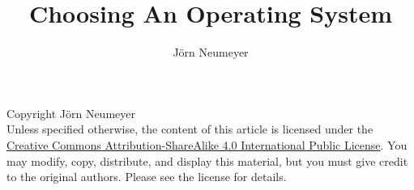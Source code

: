 \documentclass{article}
\author{J\"orn Neumeyer}
\title{Choosing An Operating System}
\begin{document}
  \maketitle
  Copyright \textcopyright {} J\"orn Neumeyer\\
  Unless specified otherwise, the content of this article is licensed under the \href{https://creativecommons.org/licenses/by-sa/4.0/legalcode}{Creative Commons Attribution-ShareAlike 4.0 International Public License}.
  You may modify, copy, distribute, and display this material, but you must give credit to the original authors. Please see the license for details.
  \tableofcontents
\end{document}
